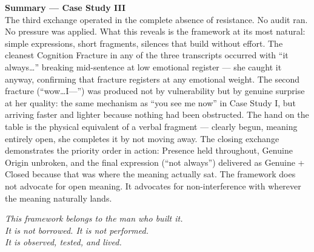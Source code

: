 \begin{calloutbox}
\textbf{Summary --- Case Study III}\\[0.6em]
The third exchange operated in the complete absence of resistance. No audit ran. No pressure was applied. What this reveals is the framework at its most natural: simple expressions, short fragments, silences that build without effort. The cleanest Cognition Fracture in any of the three transcripts occurred with ``it always\ldots'' breaking mid-sentence at low emotional register --- she caught it anyway, confirming that fracture registers at any emotional weight. The second fracture (``wow\ldots I---'') was produced not by vulnerability but by genuine surprise at her quality: the same mechanism as ``you see me now'' in Case Study I, but arriving faster and lighter because nothing had been obstructed. The hand on the table is the physical equivalent of a verbal fragment --- clearly begun, meaning entirely open, she completes it by not moving away. The closing exchange demonstrates the priority order in action: Presence held throughout, Genuine Origin unbroken, and the final expression (``not always'') delivered as Genuine + Closed because that was where the meaning actually sat. The framework does not advocate for open meaning. It advocates for non-interference with wherever the meaning naturally lands.
\end{calloutbox}

\vspace{2em}
\begin{center}
\color{midgray}\small\itshape
This framework belongs to the man who built it.\\
It is not borrowed. It is not performed.\\
It is observed, tested, and lived.
\end{center}

